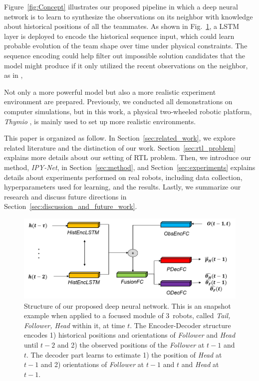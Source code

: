 \documentclass[letterpaper, 10 pt, conference]{ieeeconf}  %
\begin{document}
	Figure~\ref{fig:Concept} illustrates our proposed pipeline in which
	a deep neural network is to learn to synthesize the observations on its neighbor
	with knowledge about historical positions of all the teammates.
	As shown in Fig.~\ref{fig:DL_Pipeline}, a LSTM layer is deployed to encode
	the historical sequence input, which could learn probable evolution of the
	team shape over time under physical constraints.
	The sequence encoding could help filter out impossible solution candidates
	that the model might produce if it only utilized the recent observations on
	the neighbor, as in \cite{CPR17},

	Not only a more powerful model but also a more realistic experiment
	environment are prepared. Previously, we
	conducted all demonstrations on computer simulations, but in this work,
	a physical two-wheeled robotic platform, \emph{Thymio} \cite{Shin14}, is mainly
	used to set up more realistic environments.


	This paper is organized as follow.
	In Section~\ref{sec:related_work}, we explore related literature and the distinction of our work.
	Section~\ref{sec:rtl_problem} explains more details about our setting of RTL problem.
	Then, we introduce our method, \emph{IPY-Net}, in Section~\ref{sec:method}, and
	Section~\ref{sec:experiments} explains details about experiments performed on real robots,
	including data collection, hyperparameters used for learning, and the results.
	Lastly, we summarize our research and discuss future directions
	in Section~\ref{sec:discussion_and_future_work}.

	\begin{figure}\centering
		\includegraphics[width=1.\columnwidth]{fig_DL_Pipeline}
		\caption{Structure of our proposed deep neural network.
			This is an snapshot example when applied to a focused module of
			$3$~robots, called \emph{Tail, Follower, Head} within it, at time $t$.
			The Encoder-Decoder structure encodes
			1) historical positions and orientations of \emph{Follower} and \emph{Head}
			until $t-2$ and 2) the observed positions of the \emph{Follower} at $t-1$ and $t$.
			The decoder part learns to estimate 1) the position of \emph{Head} at $t-1$ and
			2) orientations of \emph{Follower} at $t-1$ and $t$ and \emph{Head} at $t-1$.
		}
		\label{fig:DL_Pipeline}
	\end{figure}
\end{document}
